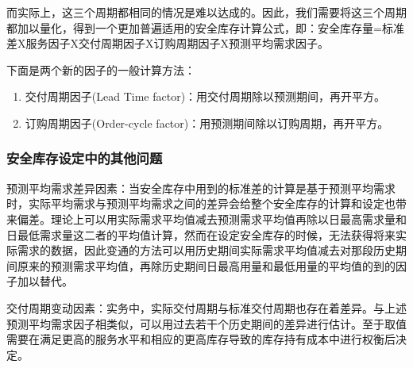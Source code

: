     而实际上，这三个周期都相同的情况是难以达成的。因此，我们需要将这三个周期都加以量化，得到一个更加普遍适用的安全库存计算公式，即：安全库存量=标准差X服务因子X交付周期因子X订购周期因子X预测平均需求因子。

    下面是两个新的因子的一般计算方法：

    \begin{enumerate}
        \item  交付周期因子(Lead Time factor)：用交付周期除以预测期间，再开平方。
        \item  订购周期因子(Order-cycle factor)：用预测期间除以订购周期，再开平方。
    \end{enumerate}

\subsubsection { 安全库存设定中的其他问题}

    预测平均需求差异因素：当安全库存中用到的标准差的计算是基于预测平均需求时，实际平均需求与预测平均需求之间的差异会给整个安全库存的计算和设定也带来偏差。理论上可以用实际需求平均值减去预测需求平均值再除以日最高需求量和日最低需求量这二者的平均值计算，然而在设定安全库存的时候，无法获得将来实际需求的数据，因此变通的方法可以用历史期间实际需求平均值减去对那段历史期间原来的预测需求平均值，再除历史期间日最高用量和最低用量的平均值的到的因子加以替代。

    交付周期变动因素：实务中，实际交付周期与标准交付周期也存在着差异。与上述预测平均需求因子相类似，可以用过去若干个历史期间的差异进行估计。至于取值需要在满足更高的服务水平和相应的更高库存导致的库存持有成本中进行权衡后决定。

